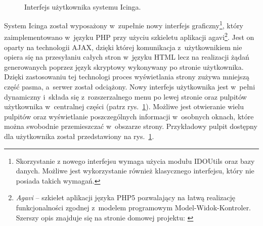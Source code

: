 \begin{figure}[ht]
\label{fig:IcingaInterface}
\caption{Interfejs użytkownika systemu Icinga.}
\begin{center}
\\[0.1cm]
\end{center}
\end{figure}

System Icinga został wyposażony w~zupełnie nowy interfejs
graficzny\footnote{Skorzystanie z nowego interfejsu wymaga użycia
  modułu IDOUtils oraz bazy danych. Możliwe jest wykorzystanie również
  klasycznego interfejsu, który nie posiada takich wymagań.}, który
zaimplementowano w~języku PHP przy użyciu szkieletu aplikacji
agavi\footnote{{\em Agavi } -- szkielet aplikacji języka PHP5
  pozwalający na łatwą realizację funkcjonalności zgodnej z~modelem
  programowym Model-Widok-Kontroler. Szerszy opis znajduje się na
  stronie domowej projektu: \cite{www:Agavi}}. Jest on oparty na
technologii AJAX, dzięki której komunikacja z~użytkownikiem nie opiera
się na przesyłaniu całych stron w~języku HTML lecz na realizacji żądań
generowanych poprzez język skryptowy wykonywany po stronie
użytkownika. Dzięki zastosowaniu tej technologi proces wyświetlania
strony zużywa mniejszą część pasma, a~serwer został odciążony. Nowy
interfejs użytkownika jest w~pełni dynamiczny i~składa się
z~rozszerzalnego menu po lewej stronie oraz pulpitów użytkownika
w~centralnej części (patrz rys.~\ref{fig:IcingaInterface}). Możliwe
jest otwieranie wielu pulpitów oraz wyświetlanie poszczególnych
informacji w~osobnych oknach, które można swobodnie przemieszczać
w~obszarze strony. Przykładowy pulpit dostępny dla użytkownika został
przedstawiony na rys.~\ref{fig:IcingaInterface}.

